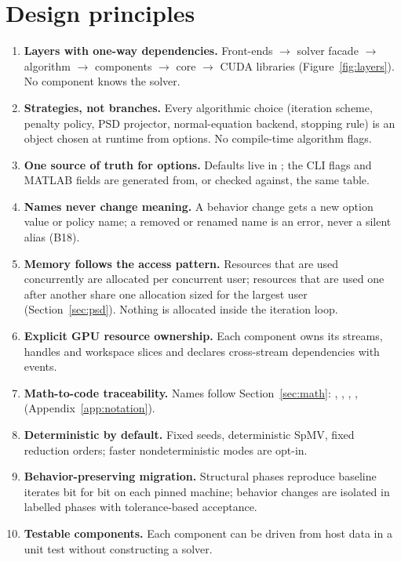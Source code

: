 \documentclass[11pt]{article}
\begin{document}
\section{Design principles}\label{sec:principles}
\begin{enumerate}[label=\textbf{\arabic*.}]
  \item \textbf{Layers with one-way dependencies.} Front-ends $\to$ solver facade $\to$ algorithm $\to$
  components $\to$ core $\to$ CUDA libraries (Figure~\ref{fig:layers}). No component knows the solver.
  \item \textbf{Strategies, not branches.} Every algorithmic choice (iteration scheme, penalty policy, PSD
  projector, normal-equation backend, stopping rule) is an object chosen at runtime from options. No
  compile-time algorithm flags.
  \item \textbf{One source of truth for options.} Defaults live in ; the CLI flags and
  MATLAB fields are generated from, or checked against, the same table.
  \item \textbf{Names never change meaning.} A behavior change gets a new option value or policy name; a
  removed or renamed name is an error, never a silent alias (B18).
  \item \textbf{Memory follows the access pattern.} Resources that are used concurrently are allocated per
  concurrent user; resources that are used one after another share one allocation sized for the largest
  user (Section~\ref{sec:psd}). Nothing is allocated inside the iteration loop.
  \item \textbf{Explicit GPU resource ownership.} Each component owns its streams, handles and workspace
  slices and declares cross-stream dependencies with events.
  \item \textbf{Math-to-code traceability.} Names follow Section~\ref{sec:math}: ,
  , , ,  (Appendix~\ref{app:notation}).
  \item \textbf{Deterministic by default.} Fixed seeds, deterministic SpMV, fixed reduction orders; faster
  nondeterministic modes are opt-in.
  \item \textbf{Behavior-preserving migration.} Structural phases reproduce baseline iterates bit for bit on
  each pinned machine; behavior changes are isolated in labelled phases with tolerance-based acceptance.
  \item \textbf{Testable components.} Each component can be driven from host data in a unit test without
  constructing a solver.
\end{enumerate}
\end{document}
